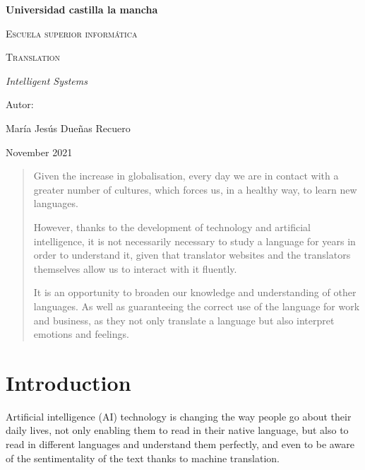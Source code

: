\documentclass[a4paper]{article}
\theoremstyle{plain}
\theoremstyle{definition}
\begin{document}
\begin{titlepage}
    \centering
    {\bfseries\LARGE Universidad castilla la mancha\par}
    \vspace{1cm}
    {\scshape\Large Escuela superior informática\par}
    \vspace{2cm}
    {\scshape\Huge Translation \par}
    \vspace{2cm}
    {\itshape\Large Intelligent Systems \par}
    \vfill
    {\Large Autor: \par}
    {\Large María Jesús Dueñas Recuero\par}
    \vfill
    {\Large November 2021 \par}
    
   
\end{titlepage}
\begin{abstract}
    Given the increase in globalisation, every day we are in contact with a greater number of cultures, which forces us, in a healthy way, to learn new languages.\par

	However, thanks to the development of technology and artificial intelligence, it is not necessarily necessary to study a language for years in order to understand it, given that translator websites and the translators themselves allow us to interact with it fluently.\par

	It is an opportunity to broaden our knowledge and understanding of other languages. As well as guaranteeing the correct use of the language for work and business, as they not only translate a language but also interpret emotions and feelings.
\end{abstract}

	\newpage
	
	\tableofcontents
	\newpage
	\section{Introduction}
	\label{sec:intro}
	Artificial intelligence (AI) technology is changing the way people go about their daily lives, not only enabling them to read in their native language, but also to read in different languages and understand them perfectly, and even to be aware of the sentimentality of the text thanks to machine translation.\par
\end{document}
